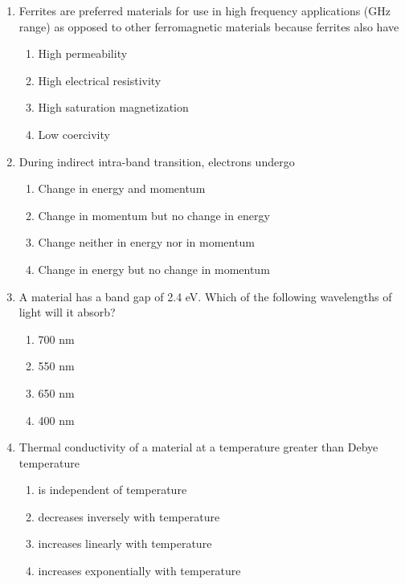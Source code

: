 \documentclass[journal,9pt,onecolumn]{IEEEtran}
\begin{document}
\begin{enumerate}
\item Ferrites are preferred materials for use in high frequency applications (GHz range) as opposed to other ferromagnetic materials because ferrites also have 
\begin{multicols}{2}
\begin{enumerate}
    \item High permeability
    \item High electrical resistivity
    \item High saturation magnetization
    \item Low coercivity
\end{enumerate}
\end{multicols}


\item  During indirect intra-band transition, electrons undergo
\begin{enumerate}
    \item Change in energy and momentum
    \item Change in momentum but no change in energy
    \item Change neither in energy nor in momentum
    \item Change in energy but no change in momentum
\end{enumerate}

\item    A material has a band gap of 2.4 eV. Which of the following wavelengths of light will it absorb?  
\begin{multicols}{4}    
\begin{enumerate}
    \item 700 nm
    \item 550 nm
    \item 650 nm
    \item 400 nm
\end{enumerate}
\end{multicols}


\item Thermal conductivity of a material at a temperature greater than Debye temperature
\begin{enumerate}
    \item is independent of temperature
    \item decreases inversely with temperature
    \item increases linearly with temperature
    \item increases exponentially with temperature
\end{enumerate}



\end{enumerate}
\end{document}
